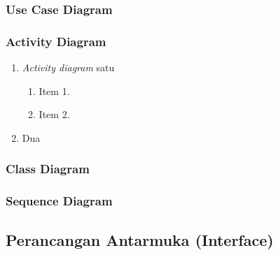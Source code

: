 \subsubsection{Use Case Diagram}

\subsubsection{Activity Diagram}
\begin{enumerate}[nolistsep,leftmargin=0.5cm]
\item \textit{Activity diagram} satu

\begin{enumerate}[label=\alph*.]
	\item Item 1.
	\item Item 2.
	\end{enumerate}
\item Dua
\end{enumerate}

\subsubsection{Class Diagram}

\subsubsection{Sequence Diagram}

\subsection{Perancangan Antarmuka (Interface)}

\newpage
